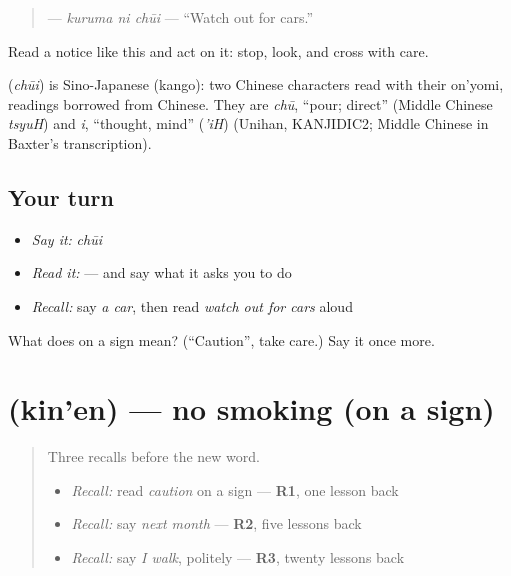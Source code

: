 \begin{quote}
\textbf{ } — \emph{kuruma ni chūi} — \textquotedblleft{}Watch out for cars.\textquotedblright{}
\end{quote}

Read a notice like this and act on it: stop, look, and cross with care.

\begin{cousinweb}
\textbf{} (\emph{chūi}) is Sino-Japanese (kango): two Chinese characters read with their on'yomi, readings borrowed from Chinese. They are \emph{chū}, \textquotedblleft{}pour; direct\textquotedblright{} (Middle Chinese \emph{tsyuH}) and \emph{i}, \textquotedblleft{}thought, mind\textquotedblright{} (\emph{'iH}) (Unihan, KANJIDIC2; Middle Chinese in Baxter's transcription).
\end{cousinweb}

\subsection*{Your turn}
\begin{itemize}
\raggedright
  \item \emph{Say it:} \emph{chūi}
  \item \emph{Read it:} \textbf{ } — and say what it asks you to do
  \item \emph{Recall:} say \emph{a car}, then read \emph{watch out for cars} aloud
\end{itemize}

\begin{tcolorbox}[breakable,colback=teal!4,colframe=teal!35!black,title={Before you move on}]
What does  on a sign mean? (\textquotedblleft{}Caution\textquotedblright{}, take care.) Say it once more.
\end{tcolorbox}
\section[\texorpdfstring{\ja{きんえん} (kin'en)}{きんえん (kin'en)}]{ (kin'en) — no smoking (on a sign)}

\label{lesson:JA-C142-kinen}



\begin{quote}
Three recalls before the new word.

\begin{itemize}
\raggedright
  \item \emph{Recall:} read \emph{caution} on a sign — \textbf{R1}, one lesson back
  \item \emph{Recall:} say \emph{next month} — \textbf{R2}, five lessons back
  \item \emph{Recall:} say \emph{I walk}, politely — \textbf{R3}, twenty lessons back
\end{itemize}
\end{quote}


